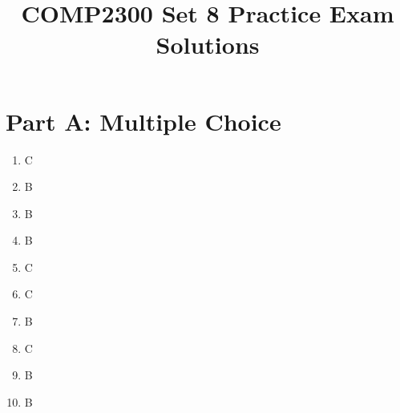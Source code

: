 \documentclass[11pt]{article}
\title{COMP2300 Set 8 Practice Exam Solutions}
\author{}
\date{}
\begin{document}
\maketitle

\section*{Part A: Multiple Choice}
\begin{enumerate}[label=\textbf{A\arabic*.}]
  \item C
  \item B
  \item B
  \item B
  \item C
  \item C
  \item B
  \item C
  \item B
  \item B
\end{enumerate}
\end{document}
